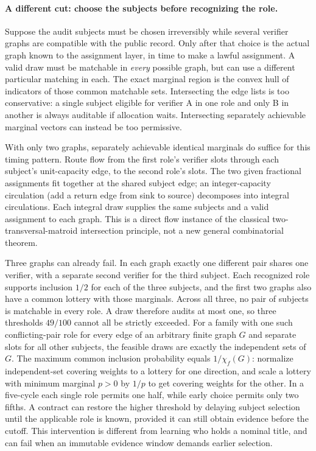 \documentclass[11pt]{article}
\begin{document}
\paragraph{A different cut: choose the subjects before recognizing the role.}
Suppose the audit subjects must be chosen irreversibly while several
verifier graphs are compatible with the public record. Only after that
choice is the actual graph known to the assignment layer, in time to
make a lawful assignment. A valid draw must be matchable in
\emph{every} possible graph, but can use a different particular matching
in each. The exact marginal region is the convex hull of indicators
of those common matchable sets. Intersecting the edge lists is too
conservative: a single subject eligible for verifier A in one role
and only B in another is always auditable if allocation waits.
Intersecting separately achievable marginal vectors can instead
be too permissive.

With only two graphs, separately achievable identical marginals do
suffice for this timing pattern. Route flow from the first role's
verifier slots through each subject's unit-capacity edge, to the
second role's slots. The two given fractional assignments fit together
at the shared subject edge; an integer-capacity circulation
(add a return edge from sink to source) decomposes into integral
circulations. Each integral draw supplies the same subjects and a
valid assignment to each graph. This is a direct flow instance of the
classical two-transversal-matroid intersection principle, not a new
general combinatorial theorem.

Three graphs can already fail. In each graph exactly one different
pair shares one verifier, with a separate second verifier for the
third subject. Each recognized role supports inclusion \(1/2\) for
each of the three subjects, and the first two graphs also have a
common lottery with those marginals. Across all three, no pair of
subjects is matchable in every role. A draw therefore audits at most
one, so three thresholds \(49/100\) cannot all be strictly exceeded.
For a family with one such conflicting-pair role for every edge of an
arbitrary finite graph \(G\) and separate slots for all other subjects,
the feasible draws are exactly the independent sets of \(G\).
The maximum common inclusion probability equals \(1/\chi_f(G)\):
normalize independent-set covering weights to a lottery for one
direction, and scale a lottery with minimum marginal \(p>0\) by
\(1/p\) to get covering weights for the other. In a five-cycle each
single role permits one half, while early choice permits only two
fifths. A contract can restore the higher threshold by delaying
subject selection until the applicable role is known, provided it
can still obtain evidence before the cutoff. This intervention is
different from learning who holds a nominal title, and can fail when
an immutable evidence window demands earlier selection.
\end{document}
